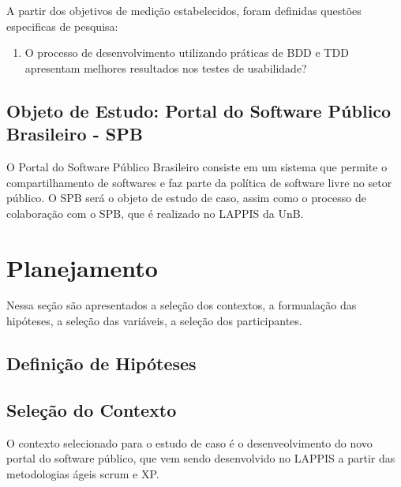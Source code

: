 A partir dos objetivos de medição estabelecidos, foram definidas questões especificas de pesquisa:
\begin{enumerate}

\item O processo de desenvolvimento utilizando práticas de BDD e TDD apresentam melhores resultados nos testes de usabilidade?
\end{enumerate}

\subsection{Objeto de Estudo: Portal do Software Público Brasileiro - SPB}

O Portal do Software Público Brasileiro consiste em um sistema que permite o compartilhamento de softwares e faz parte da política de software livre no setor público.
O SPB será o objeto de estudo de caso, assim como o processo de colaboração com o SPB, que é realizado no LAPPIS da UnB.

\section{Planejamento}

Nessa seção são apresentados a seleção dos contextos, a formualação das hipóteses, a seleção das variáveis, a seleção dos participantes.


\subsection{Definição de Hipóteses}


\subsection{Seleção do Contexto}

O contexto selecionado para o estudo de caso é o desenveolvimento do novo portal do software público, que vem sendo desenvolvido no LAPPIS a partir das metodologias ágeis scrum e XP.		

